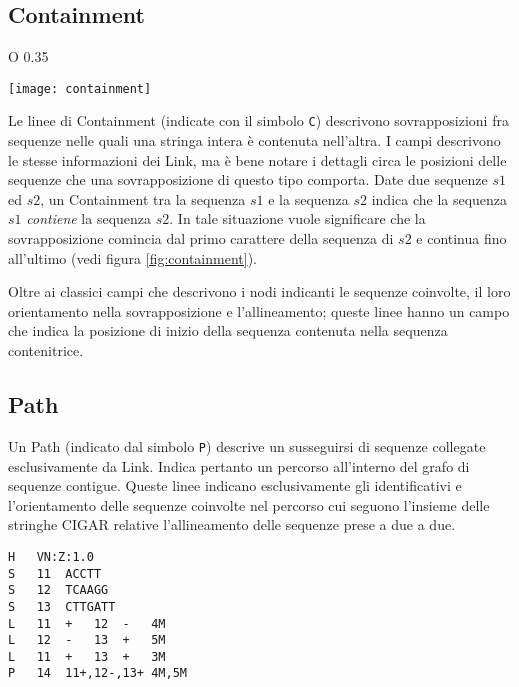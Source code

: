 \subsection{Containment}
\label{sec:containment}
\begin{wrapfigure} {O} {0.35\textwidth}
	\begin{centering}	
		\texttt{[image: containment]}
		\caption[Rappresentazione di una situazione di contenimento fra sequenze]
		{Una rappresentazione grafica della situazione di contenimento fra due sequenze.}
		\label{fig:containment}
	\end{centering}
\end{wrapfigure}
Le linee di Containment (indicate con il simbolo \texttt{C})
descrivono sovrapposizioni fra sequenze nelle quali una stringa intera
è contenuta nell'altra.
I campi descrivono le stesse informazioni dei Link, ma è bene notare
i dettagli circa le posizioni delle sequenze che una sovrapposizione di
questo tipo comporta.
Date due sequenze $s1$ ed $s2$, un Containment tra la sequenza $s1$ e la
sequenza $s2$ indica che la sequenza $s1$ \emph{contiene} la sequenza
$s2$. In tale situazione vuole significare che la sovrapposizione comincia
dal primo carattere della sequenza di $s2$ e continua fino all'ultimo
(vedi figura \ref{fig:containment}).

Oltre ai classici campi che descrivono i nodi indicanti le sequenze coinvolte,
il loro orientamento nella sovrapposizione e l'allineamento; queste linee hanno un campo
che indica la posizione di inizio della sequenza contenuta nella sequenza
contenitrice.

\subsection{Path}
Un Path (indicato dal simbolo \texttt{P}) descrive un susseguirsi di
sequenze collegate esclusivamente da Link. Indica pertanto un percorso
all'interno del grafo di sequenze contigue. Queste linee
indicano esclusivamente gli identificativi e l'orientamento delle sequenze
coinvolte nel percorso cui seguono l'insieme delle stringhe CIGAR relative
l'allineamento delle sequenze prese a due a due.

\newpage
\captionsetup{justification=centering, singlelinecheck=false}
\begin{lstlisting}[basicstyle=\ttfamily, frame=topline, caption=Un esempio di file GFA 1.]
H	VN:Z:1.0
S	11	ACCTT
S	12	TCAAGG
S	13	CTTGATT
L	11	+	12	-	4M
L	12	-	13	+	5M
L	11	+	13	+	3M
P	14	11+,12-,13+	4M,5M
\end{lstlisting}
\captionsetup{justification=justified, singlelinecheck=false}


